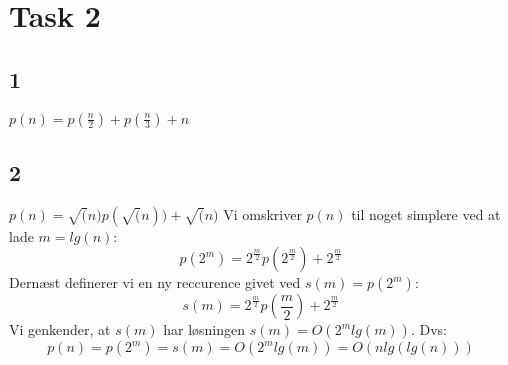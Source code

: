 \section{Task 2}

\subsection{1}

$p(n) = p(\frac{n}{2}) + p(\frac{n}{3}) + n$

\subsection{2}

$p(n) = \sqrt(n)p(\sqrt(n)) + \sqrt(n)$
Vi omskriver $p(n)$ til noget simplere ved at lade $m = lg(n)$:
$$p(2^m) = 2^{\frac{m}{2}}p(2^{\frac{m}{2}}) + 2^{\frac{m}{2}}$$
Dernæst definerer vi en ny reccurence givet ved $s(m) = p(2^m)$:
$$s(m) = 2^{\frac{m}{2}}p(\frac{m}{2}) + 2^{\frac{m}{2}}$$
Vi genkender, at $s(m)$ har løsningen $s(m) = O(2^mlg(m))$.
Dvs:
$$p(n) = p(2^m) = s(m) = O(2^mlg(m)) = O(nlg(lg(n)))$$

